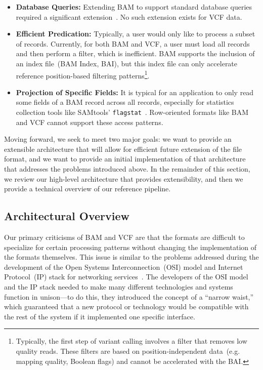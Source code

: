 \documentclass{bioinfo}
\begin{document}
\begin{itemize}
\item \textbf{Database Queries:} Extending BAM to support standard database queries required a significant extension~\citep{kozanitis13}.
No such extension exists for VCF data.
\item \textbf{Efficient Predication:} Typically, a user would only like to process a subset of records. Currently, for both BAM and VCF, a user must load all
records and then perform a filter, which is inefficient. BAM supports the inclusion of an index file~(BAM Index, BAI), but this index file can only accelerate
reference position-based filtering patterns\footnote{Typically, the first step of variant calling involves a filter that removes low quality reads. These filters
are based on position-independent data~(e.g. mapping quality, Boolean flags) and cannot be accelerated with the BAI.}.
\item \textbf{Projection of Specific Fields:} It is typical for an application to only read some fields of a BAM record across all records, especially for
statistics collection tools like SAMtools' \texttt{flagstat}~\citep{li09}. Row-oriented formats like BAM and VCF cannot support these access patterns.
\end{itemize}

Moving forward, we seek to meet two major goals: we want to provide an extensible architecture that will allow for efficient future extension of the
file format, and we want to provide an initial implementation of that architecture that addresses the problems introduced above. In the remainder
of this section, we review our high-level architecture that provides extensibility, and then we provide a technical overview of our reference pipeline.

\subsection{Architectural Overview}
\label{sec:architectural-overview}

Our primary criticisms of BAM and VCF are that the formats are difficult to specialize for certain processing patterns without
changing the implementation of the formats themselves. This issue is similar to the problems addressed during the development of the Open
Systems Interconnection~(OSI) model and Internet Protocol~(IP) stack for networking services~\citep{zimmermann80}. The developers
of the OSI model and the IP stack needed to make many different technologies and systems function in unison---to do this, they introduced the
concept of a ``narrow waist,'' which guaranteed that a new protocol or technology would be compatible with the rest of the system if it implemented
one specific interface.
\end{document}
